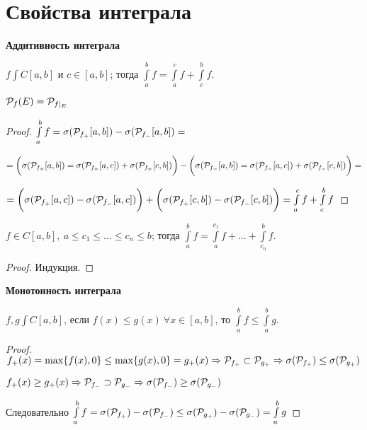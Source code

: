 \section{Свойства интеграла}

\begin{theorem}
    \textbf{Аддитивность интеграла}

    $f\int C[a,b]$ и $c\in[a,b]$; тогда $\int\limits_a^b f= \int\limits_a^c f + \int\limits_c^b f$.
\end{theorem}

\begin{designation}
    $\mathcal{P} _f(E)=\mathcal{P}_{f|_E}$
\end{designation}

\begin{proof}
    $\int\limits_a^b f = \sigma (\mathcal{P}_{f_+}[a,b])-\sigma (\mathcal{P}_{f_-}[a,b])=$

    $=\bigg(\sigma (\mathcal{P}_{f_+}[a,b])= \sigma (\mathcal{P}_{f_+}[a,c])+\sigma (\mathcal{P}_{f_+}[c,b])\bigg)-\bigg(\sigma (\mathcal{P}_{f_-}[a,b])=\sigma (\mathcal{P}_{f_-}[a,c])+\sigma (\mathcal{P}_{f_-}[c,b])\bigg)=$

    $=\bigg(\sigma (\mathcal{P}_{f_+}[a,c])-\sigma (\mathcal{P}_{f_-}[a,c])\bigg)+\bigg(\sigma (\mathcal{P}_{f_+}[c,b])-\sigma (\mathcal{P}_{f_-}[c,b])\bigg)=\int\limits_a^c f +\int\limits_c^b f$
\end{proof}

\begin{corollary}
    $f\in C[a,b],\ a\leq c_1\leq...\leq c_n\leq b$; тогда $\int\limits_a^b f = \int\limits_a^{c_1} f + ... + \int\limits_{c_n}^b f$.
\end{corollary}

\begin{proof}
    Индукция.
\end{proof}

\begin{theorem}
    \textbf{Монотонность интеграла}

    $f,g\int C[a,b]$, если $f(x)\leq g(x)\ \forall x \in  [a,b]$, то $\int\limits_a^b f\leq \int\limits_a^b g$.
\end{theorem}

\begin{proof}
    $f_+(x)=\max \{f(x), 0\}\leq \max \{g(x), 0\}=g_+(x)\Rightarrow \mathcal{P} _{f_+}\subset\mathcal{P} _{g_+}\Rightarrow \sigma(\mathcal{P} _{f_+})\leq\sigma(\mathcal{P} _{g_+})$
    
    $f_+(x)\geq g_+(x)\Rightarrow \mathcal{P} _{f_-}\supset\mathcal{P} _{g_-}\Rightarrow \sigma(\mathcal{P} _{f_-})\geq\sigma(\mathcal{P} _{g_-})$

    Следовательно $\int\limits_a^b f=\sigma(\mathcal{P} _{f_+})-\sigma(\mathcal{P} _{f_-})\leq \sigma(\mathcal{P} _{g_+})-\sigma(\mathcal{P} _{g_-})=\int\limits_a^b g$
\end{proof}

